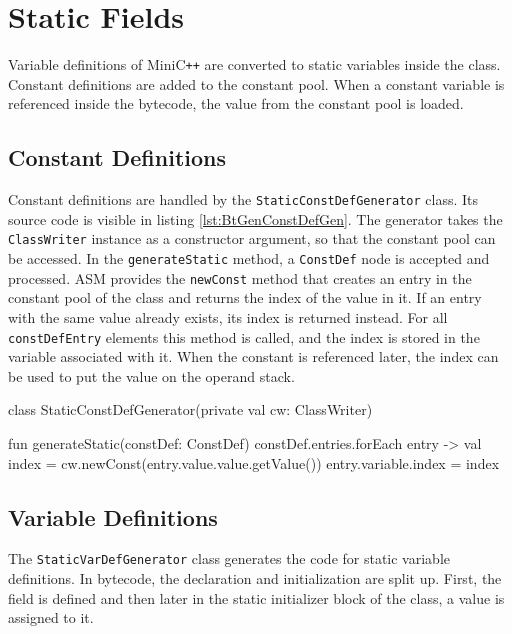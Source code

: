 \section{Static Fields}

Variable definitions of MiniC\verb|++| are converted to static variables inside the class. Constant definitions are added to the constant pool. When a constant variable is referenced inside the bytecode, the value from the constant pool is loaded. 

\subsection{Constant Definitions}

Constant definitions are handled by the \verb|StaticConstDefGenerator| class. Its source code is visible in listing \ref{lst:BtGenConstDefGen}. The generator takes the \verb|ClassWriter| instance as a constructor argument, so that the constant pool can be accessed. In the \verb|generateStatic| method, a \verb|ConstDef| node is accepted and processed. ASM provides the \verb|newConst| method that creates an entry in the constant pool of the class and returns the index of the value in it. If an entry with the same value already exists, its index is returned instead. For all \verb|constDefEntry| elements this method is called, and the index is stored in the variable associated with it. When the constant is referenced later, the index can be used to put the value on the operand stack.


\begin{KotlinCode}[float,numbers=none,caption=Code of the \texttt{StaticConstDefGenerator} class., label=lst:BtGenConstDefGen]
class StaticConstDefGenerator(private val cw: ClassWriter) {

fun generateStatic(constDef: ConstDef) {
    constDef.entries.forEach { entry ->
        val index = cw.newConst(entry.value.value.getValue())
        entry.variable.index = index
    }
}
}
\end{KotlinCode}

\subsection{Variable Definitions}

The \verb|StaticVarDefGenerator| class generates the code for static variable definitions. In bytecode, the declaration and initialization are split up. First, the field is defined and then later in the static initializer block of the class, a value is assigned to it.

